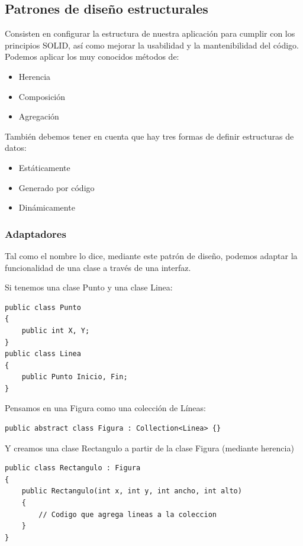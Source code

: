 \documentclass[twoside,twocolumn]{article}
\begin{document}
\subsection{Patrones de diseño estructurales}

Consisten en configurar la estructura de nuestra aplicación para cumplir con los principios SOLID, así como mejorar la usabilidad y la mantenibilidad del código. Podemos aplicar los muy conocidos métodos de:

\begin{itemize}
\item Herencia
\item Composición
\item Agregación
\end{itemize}

También debemos tener en cuenta que hay tres formas de definir estructuras de datos:

\begin{itemize}
\item Estáticamente
\item Generado por código
\item Dinámicamente
\end{itemize}

\subsubsection{Adaptadores}

Tal como el nombre lo dice, mediante este patrón de diseño, podemos adaptar la funcionalidad de una clase a través de una interfaz.

Si tenemos una clase Punto y una clase Linea:
\lstset{breaklines=true,style=sharpc}
\begin{lstlisting}
public class Punto
{
    public int X, Y;
}
public class Linea
{
    public Punto Inicio, Fin;
}
\end{lstlisting}

Pensamos en una Figura como una colección de Líneas:
\lstset{breaklines=true,style=sharpc}
\begin{lstlisting}
public abstract class Figura : Collection<Linea> {}
\end{lstlisting}

Y creamos una clase Rectangulo a partir de la clase Figura (mediante herencia)
\lstset{breaklines=true,style=sharpc}
\begin{lstlisting}
public class Rectangulo : Figura
{
    public Rectangulo(int x, int y, int ancho, int alto)
    {
        // Codigo que agrega lineas a la coleccion
    }
}
\end{lstlisting}
\end{document}
